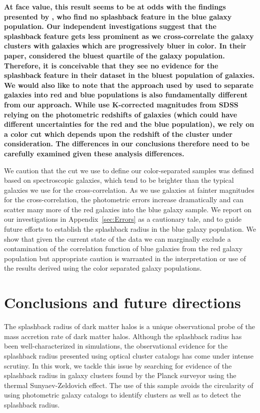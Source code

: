 \documentclass[iop, apjl, twocolappendix, numberedappendix]{emulateapj}
\begin{document}
\textbf{At face value, this result seems to be at odds with the findings
presented by \citet{baxter2017halo}, who find no splashback feature in the blue
galaxy population. Our independent investigations suggest that the splashback
feature gets less prominent as we cross-correlate the galaxy clusters with
galaxies which are progressively bluer in color. In their paper,
\citet{baxter2017halo} considered the bluest quartile of the galaxy population.
Therefore, it is conceivable that they see no evidence for the splashback
feature in their dataset in the bluest population of galaxies. We would also
like to note that the approach used by \citet{baxter2017halo} used to separate
galaxies into red and blue populations is also fundamentally different from our
approach. While \citet{baxter2017halo} use K-corrected magnitudes from SDSS
relying on the photometric redshifts of galaxies (which could have different
uncertainties for the red and the blue population), we rely on a color cut
which depends upon the redshift of the cluster under consideration. The
differences in our conclusions therefore need to be carefully examined given
these analysis differences.}

We caution that the cut we use to define our color-separated samples was
defined based on spectroscopic galaxies, which tend to be brighter
than the typical galaxies we use for the cross-correlation. As we use
galaxies at fainter magnitudes for the cross-correlation, the
photometric errors increase dramatically and can scatter many more of
the red galaxies into the blue galaxy sample. We report on
our investigations in Appendix~\ref{sec:Errors} as a cautionary tale,
and to guide future efforts to establish the splashback radius in the
blue galaxy population. We show that given the current state of the
data we can marginally exclude a contamination of the correlation
function of blue galaxies from the red galaxy population but
appropriate caution is warranted in the interpretation or use of the
results derived using the color separated galaxy populations.


\section{Conclusions and future directions}
\label{sec:Conclusions}
The splashback radius of dark matter halos is a unique observational
probe of the mass accretion rate of dark matter halos. Although the
splashback radius has been well-characterized in simulations, the
observational evidence for the splashback radius presented using
optical cluster catalogs has come under intense scrutiny. In this
work, we tackle this issue by searching for evidence of the
splashback radius in galaxy clusters found by the Planck surveyor using
the thermal Sunyaev-Zeldovich effect. The use of this sample avoids
the circularity of using photometric galaxy catalogs to identify
clusters as well as to detect the splashback radius.
\end{document}
